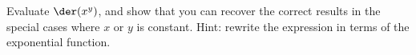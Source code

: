 Evaluate $\der(x^y)$, and show that you can recover the correct results
in the special cases where $x$ or $y$ is constant. Hint: rewrite the expression
in terms of the exponential function.
